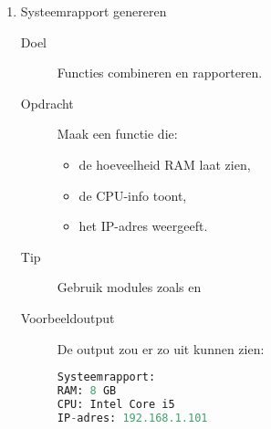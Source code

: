 \begin{enumerate}
\item Systeemrapport genereren
	\begin{description}
	\item[Doel] Functies combineren en rapporteren.
	\item[Opdracht] Maak een functie  die:
		\begin{itemize}
		\item de hoeveelheid RAM laat zien,
		\item de CPU-info toont,
		\item het IP-adres weergeeft.
		\end{itemize}
	\item[Tip] Gebruik modules zoals  en 
	\item[Voorbeeldoutput] De output zou er zo uit kunnen zien:
\begin{lstlisting}[language=python]
Systeemrapport:
RAM: 8 GB
CPU: Intel Core i5
IP-adres: 192.168.1.101
\end{lstlisting}
	\end{description}
\end{enumerate}

